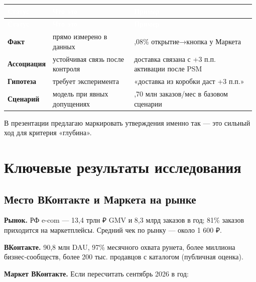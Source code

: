 \documentclass[10pt,a4paper]{article}
\begin{document}
\begingroup
\small
\setlength{\tabcolsep}{3pt}
\renewcommand{\arraystretch}{1.12}
\begin{longtable}{@{}>{\raggedright\arraybackslash}p{0.1121\linewidth}>{\raggedright\arraybackslash}p{0.3475\linewidth}>{\raggedright\arraybackslash}p{0.5157\linewidth}@{}}
\rowcolor{blue}
\textcolor{white}{\textbf{Статус}} & \textcolor{white}{\textbf{Что это}} & \textcolor{white}{\textbf{Пример}} \\
\endfirsthead
\rowcolor{blue}
\textcolor{white}{\textbf{Статус}} & \textcolor{white}{\textbf{Что это}} & \textcolor{white}{\textbf{Пример}} \\
\endhead
\hline
\textbf{Факт} & прямо измерено в данных & 3,08\% открытие→кнопка у Маркета \\
\textbf{Ассоциация} & устойчивая связь после контроля & доставка связана с +3 п.п. активации после PSM \\
\textbf{Гипотеза} & требует эксперимента & «доставка из коробки даст +3 п.п.» \\
\textbf{Сценарий} & модель при явных допущениях & 1,70 млн заказов/мес в базовом сценарии \\
\hline
\end{longtable}
\endgroup
\vspace{4pt}

В презентации предлагаю маркировать утверждения именно так — это сильный ход для критерия «глубина».\par

\clearpage

\section{Ключевые результаты исследования}

\subsection{Место ВКонтакте и Маркета на рынке}

\textbf{Рынок.} РФ e-com — 13,4 трлн ₽ GMV и 8,3 млрд заказов в год; 81\% заказов приходится на маркетплейсы. Средний чек по рынку — около 1 600 ₽.\par

\textbf{ВКонтакте.} 90,8 млн DAU, 97\% месячного охвата рунета, более миллиона бизнес-сообществ, более 200 тыс. продавцов с каталогом (публичная оценка).\par

\textbf{Маркет ВКонтакте.} Если пересчитать сентябрь 2026 в год:\par
\end{document}
